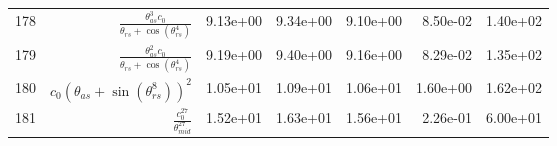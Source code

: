 \begin{tabularx}{\textwidth}{lRRRRRl}
178  &  $ \displaystyle\frac{\theta_{as}^{3} c_{0}}{\theta_{rs} + \cos{\left(\theta_{rs}^{4} \right)}} $  &  9.13e+00  &  9.34e+00  &  9.10e+00  &  8.50e-02  &  1.40e+02  \\ 
179  &  $ \displaystyle\frac{\theta_{as}^{2} c_{0}}{\theta_{rs} + \cos{\left(\theta_{rs}^{4} \right)}} $  &  9.19e+00  &  9.40e+00  &  9.16e+00  &  8.29e-02  &  1.35e+02  \\ 
180  &  $ c_{0} \left(\theta_{as} + \sin{\left(\theta_{rs}^{8} \right)}\right)^{2} $  &  1.05e+01  &  1.09e+01  &  1.06e+01  &  1.60e+00  &  1.62e+02  \\ 
181  &  $ \displaystyle\frac{c_{0}^{27}}{\theta_{mid}^{27}} $  &  1.52e+01  &  1.63e+01  &  1.56e+01  &  2.26e-01  &  6.00e+01  \\ 
\bottomrule
\end{tabularx}
